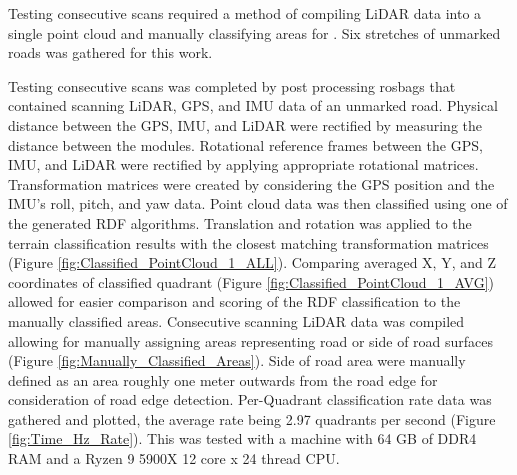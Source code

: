 \documentclass[journal,onecolumn]{IEEEtran}
\begin{document}
	{Testing consecutive scans required a method of compiling LiDAR data into a single point cloud and manually classifying areas for . Six stretches of unmarked roads was gathered for this work. }
	
	
	{Testing consecutive scans was completed by post processing rosbags that contained scanning LiDAR, GPS, and IMU data of an unmarked road. Physical distance between the GPS, IMU, and LiDAR were rectified by measuring the distance between the modules. Rotational reference frames between the GPS, IMU, and LiDAR were rectified by applying appropriate rotational matrices. Transformation matrices were created by considering the GPS position and the IMU's roll, pitch, and yaw data. Point cloud data was then classified using one of the generated RDF algorithms. Translation and rotation was applied to the terrain classification results with the closest matching transformation matrices (Figure \ref{fig:Classified_PointCloud_1_ALL}). Comparing averaged X, Y, and Z coordinates of classified quadrant (Figure \ref{fig:Classified_PointCloud_1_AVG}) allowed for easier comparison and scoring of the RDF classification to the manually classified areas. Consecutive scanning LiDAR data was compiled allowing for manually assigning areas representing road or side of road surfaces (Figure \ref{fig:Manually_Classified_Areas}). Side of road area were manually defined as an area roughly one meter outwards from the road edge for consideration of road edge detection. Per-Quadrant classification rate data was gathered and plotted, the average rate being 2.97 quadrants per second (Figure \ref{fig:Time_Hz_Rate}). This was tested with a machine with 64 GB of DDR4 RAM and a Ryzen 9 5900X 12 core x 24 thread CPU.}
	
\end{document}
